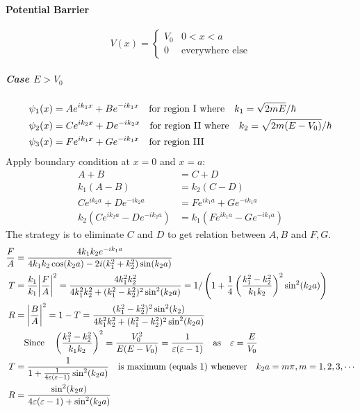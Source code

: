 \documentclass[a4paper,10pt]{article}
\begin{document}
\paragraph{Potential Barrier}
$$V(x)=\begin{cases}
        V_0 & 0<x<a                  \\
        0   & \text{everywhere else}
    \end{cases}$$
\subparagraph{Case $E>V_0$}
\begin{align*}
    \psi_1(x) & =Ae^{ik_1x}+Be^{-ik_1x}\qq{for region I where}k_1=\sqrt{2mE}/\hbar        \\
    \psi_2(x) & =Ce^{ik_2x}+De^{-ik_2x}\qq{for region II where}k_2=\sqrt{2m(E-V_0)}/\hbar \\
    \psi_3(x) & =Fe^{ik_1x}+Ge^{-ik_1x}\qq{for region III}
\end{align*}
Apply boundary condition at $x=0$ and $x=a$:
\begin{align*}
    A+B                         & =C+D                         \\
    k_1(A-B)                    & =k_2(C-D)                    \\
    Ce^{ik_2a}+De^{-ik_2a}      & =Fe^{ik_1a}+Ge^{-ik_1a}      \\
    k_2(Ce^{ik_2a}-De^{-ik_2a}) & =k_1(Fe^{ik_1a}-Ge^{-ik_1a})
\end{align*}
The strategy is to eliminate $C$ and $D$ to get relation between $A,B$ and $F,G$.
\begin{align*}
    \frac{F}{A} & =\frac{4k_1k_2e^{-ik_1a}}{4k_1k_2\cos(k_2a)-2i(k_1^2+k_2^2)\sin(k_2a)}                                                                                                            \\
    T           & =\frac{k_1}{k_1}\abs{\frac{F}{A}}^2=\frac{4k_1^2k_2^2}{4k_1^2k_2^2+(k_1^2-k_2^2)^2\sin^2(k_2a)}=1/\left(1+\frac{1}{4}\left(\frac{k_1^2-k_2^2}{k_1k_2}\right)^2\sin^2(k_2a)\right) \\
    R           & =\abs{\frac{B}{A}}^2=1-T=\frac{(k_1^2-k_2^2)^2\sin^2(k_2)}{4k_1^2k_2^2+(k_1^2-k_2^2)^2\sin^2(k_2a)}                                                                               \\
                & \qq{Since} \left(\frac{k_1^2-k_2^2}{k_1k_2}\right)^2=\frac{V_0^2}{E(E-V_0)}=\frac{1}{\varepsilon(\varepsilon-1)}\qq{as}\varepsilon=\frac{E}{V_0}                                  \\
    T           & =\frac{1}{1+\frac{1}{4\varepsilon(\varepsilon-1)}\sin^2(k_2a)}\qq{is maximum (equals 1) whenever}k_2a=m\pi,m=1,2,3,\cdots                                                         \\
    R           & =\frac{\sin^2(k_2a)}{4\varepsilon(\varepsilon-1)+\sin^2(k_2a)}
\end{align*}
\end{document}
